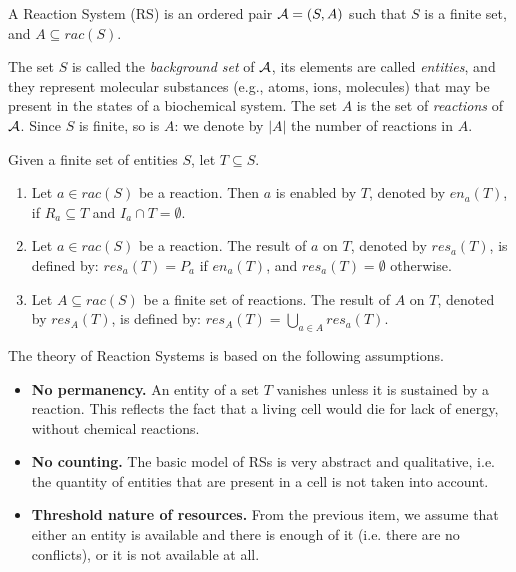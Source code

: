 \begin{definition}
A Reaction System (RS) is an ordered pair ${\cal A} = (S, A)$ 
such that $S$ is a finite set, and $A \subseteq rac(S)$.
\end{definition}

The set $S$ is called the \emph{background set} of ${\cal A}$, its elements are called \emph{entities},
and they represent molecular substances (e.g., atoms, ions, molecules) that may be present
in the states of a biochemical system.
The set $A$ is the set of \emph{reactions} of ${\cal A}$.
Since $S$ is finite, so is $A$: 
we denote by $|A|$ the number of reactions in $A$.

\begin{definition}
Given a finite set of entities $S$, let $T\subseteq S$.
\begin{enumerate}
\item Let $a\in rac(S)$ be a reaction. Then $a$ is enabled by $T$, denoted by $en_a(T)$, 
if $R_a \subseteq T$
and $I_a \cap T = \emptyset$. 
\item Let $a\in rac(S)$ be a reaction. The result of $a$ on $T$, denoted by $res_a(T)$, 
is defined by:
$res_a(T) =P_a$ if $en_a(T)$, and $res_a(T) = \emptyset$ otherwise.
\item Let $A\subseteq rac(S)$ be a finite set of reactions. The result of $A$ on $T$, denoted 
by $res_A(T)$,  is defined
by: $res_A(T) = \bigcup_{a \in A} res_a(T)$.
\end{enumerate}
\end{definition}


The theory of Reaction Systems is based on the following assumptions.
\begin{itemize}
\item {\bf No permanency.} An entity of a set $T$ vanishes unless it is sustained 
by a reaction. This reflects the fact that a living cell would die for lack 
of energy, without chemical reactions.
\item {\bf No counting.} The basic model of RSs is very abstract and 
qualitative, i.e. the quantity of entities that are present 
in a cell is not taken into account. 
\item {\bf Threshold nature of resources.} From the 
previous item,
we assume that either an entity is available and there is enough of it 
(i.e. there are no conflicts), or it is not available at all.
\end{itemize}




